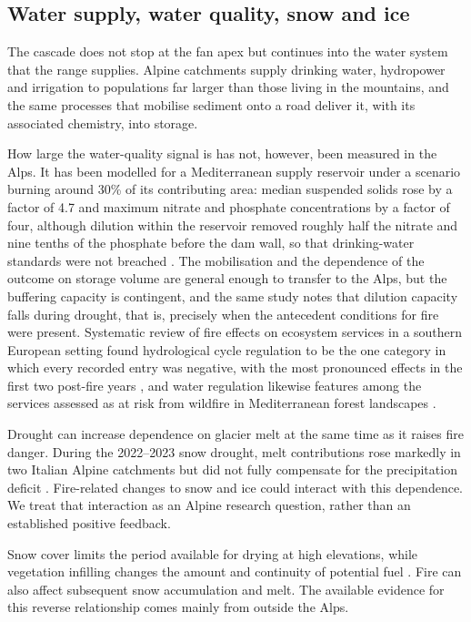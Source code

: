 \documentclass[11pt,a4paper]{article}
\begin{document}
\subsection{Water supply, water quality, snow and ice}

The cascade does not stop at the fan apex but continues into the water system that the range supplies. Alpine catchments supply drinking water, hydropower and irrigation to populations far larger than those living in the mountains, and the same processes that mobilise sediment onto a road deliver it, with its associated chemistry, into storage.

How large the water-quality signal is has not, however, been measured in the Alps. It has been modelled for a Mediterranean supply reservoir under a scenario burning around 30\% of its contributing area: median suspended solids rose by a factor of 4.7 and maximum nitrate and phosphate concentrations by a factor of four, although dilution within the reservoir removed roughly half the nitrate and nine tenths of the phosphate before the dam wall, so that drinking-water standards were not breached \citep{basso_potential_2021}. The mobilisation and the dependence of the outcome on storage volume are general enough to transfer to the Alps, but the buffering capacity is contingent, and the same study notes that dilution capacity falls during drought, that is, precisely when the antecedent conditions for fire were present. Systematic review of fire effects on ecosystem services in a southern European setting found hydrological cycle regulation to be the one category in which every recorded entry was negative, with the most pronounced effects in the first two post-fire years \citep{misseyanni_impact_2025}, and water regulation likewise features among the services assessed as at risk from wildfire in Mediterranean forest landscapes \citep{lecinadiaz_assessing_2021}.

Drought can increase dependence on glacier melt at the same time as it raises fire danger. During the 2022--2023 snow drought, melt contributions rose markedly in two Italian Alpine catchments but did not fully compensate for the precipitation deficit \citep{leone_20222023_2026}. Fire-related changes to snow and ice could interact with this dependence. We treat that interaction as an Alpine research question, rather than an established positive feedback.

Snow cover limits the period available for drying at high elevations, while vegetation infilling changes the amount and continuity of potential fuel \citep{rangwala_climate_2012, frei_evidence_2023}. Fire can also affect subsequent snow accumulation and melt. The available evidence for this reverse relationship comes mainly from outside the Alps.
\end{document}

